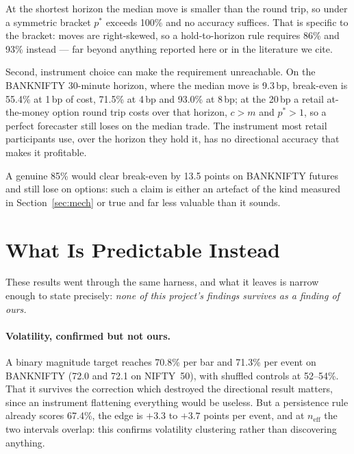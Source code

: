 \documentclass[runningheads]{llncs}
\begin{document}
At the shortest horizon the median move is smaller than the round trip, so under
a symmetric bracket $p^{\ast}$ exceeds 100\% and no accuracy suffices. That is
specific to the bracket: moves are right-skewed, so a hold-to-horizon rule
requires 86\% and 93\% instead --- far beyond anything reported here or in the
literature we cite.

Second, instrument choice can make the requirement unreachable. On the BANKNIFTY
30-minute horizon, where the median move is 9.3\,bp, break-even is 55.4\% at
1\,bp of cost, 71.5\% at 4\,bp and 93.0\% at 8\,bp; at the 20\,bp a retail
at-the-money option round trip costs over that horizon, $c > m$ and
$p^{\ast}>1$, so a perfect forecaster still loses on the median trade. The
instrument most retail participants use, over the horizon they hold it, has no
directional accuracy that makes it profitable.

A genuine 85\% would clear break-even by 13.5 points on BANKNIFTY futures and
still lose on options: such a claim is either an artefact of the kind measured in
Section~\ref{sec:mech} or true and far less valuable than it sounds.

\section{What Is Predictable Instead}

These results went through the same harness, and what it leaves is narrow enough
to state precisely: \emph{none of this project's findings survives as a finding
of ours.}

\paragraph{Volatility, confirmed but not ours.}
A binary magnitude target reaches 70.8\% per bar and 71.3\% per event on
BANKNIFTY (72.0 and 72.1 on NIFTY~50), with shuffled controls at 52--54\%. That
it survives the correction which destroyed the directional result matters, since
an instrument flattening everything would be useless. But a persistence rule
already scores 67.4\%, the edge is $+3.3$ to $+3.7$ points per event, and at
$n_{\text{eff}}$ the two intervals overlap: this confirms volatility clustering
\cite{engle1982} rather than discovering anything.
\end{document}
